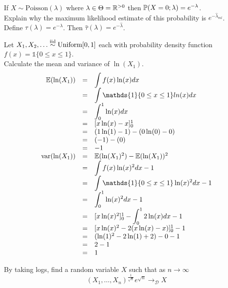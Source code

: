 \documentclass[11pt,a4paper]{article}
\begin{document}
\qpart
If $X\sim\text{Poisson}(\lambda)$ where $\lambda\in\Theta=\mathbb{R}^{>0}$ then $\mathbb{P}(X=0;\lambda)=e^{-\lambda}$.\\
Explain why the maximum likelihood estimate of this probability is $e^{-\hat{\lambda}_{ml}}$.\\

\apart
Define $\tau(\lambda)=e^{-\lambda}$. Then $\hat{\tau}(\lambda)=e^{-\hat{\lambda}}$.

\question
Let $X_1,X_2,\dots\overset{\text{iid}}{\sim}\text{Uniform}[0,1]$ each with probability density function $f(x)=\mathds{1}\{0\leq x\leq1\}$.\\

\qpartnb Calculate the mean and variance of $\ln(X_1)$.\\

\apart
\[\begin{array}{rcl}
\expect(\ln(X_1))&=&{\displaystyle\int f(x)\ln(x)dx}\\
&=&{\displaystyle\int\mathds{1}\{0\leq x\leq1\}ln(x)dx}\\
&=&{\displaystyle\int_0^1\ln(x)dx}\\
&=&[x\ln(x)-x]_0^1\\
&=&(1\ln(1)-1)-(0\ln(0)-0)\\
&=&(-1)-(0)\\
&=&-1\\
\var(\ln(X_1))&=&\expect(\ln(X_1)^2)-\expect(\ln(X_1))^2\\
&=&{\displaystyle\int f(x)\ln(x)^2dx-1}\\
&=&{\displaystyle\int \mathds{1}\{0\leq x\leq1\}\ln(x)^2dx-1}\\
&=&{\displaystyle\int_0^1\ln(x)^2dx-1}\\
&=&{[x\ln(x)^2]_0^1-\displaystyle\int_0^12\ln(x)dx-1}\\
&=&[x\ln(x)^2-2(x\ln(x)-x)]_0^1-1\\
&=&(\ln(1)^2-2\ln(1)+2)-0-1\\
&=&2-1\\
&=&1
\end{array}\]


\qpartnb By taking logs, find a random variable $X$ such that as $n\to\infty$
$$(X_1,\dots,X_n)^{\frac{1}{\sqrt{n}}}e^{\sqrt{n}}\to_\mathcal{D}X$$

\apart
\end{document}
